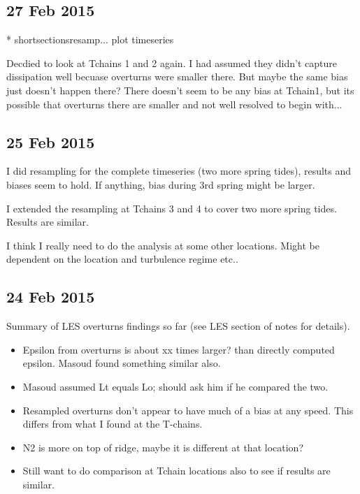 \documentclass[11pt]{article}
\begin{document}
\clearpage
\newpage
\subsection{27 Feb 2015}


* shortsectionsresamp... plot timeseries

Decdied to look at Tchains 1 and 2 again. I had assumed they didn't capture dissipation well becuase overturns were smaller there. But maybe the same bias just doesn't happen there? There doesn't seem to be any bias at Tchain1, but its possible that overturns there are smaller and not well resolved to begin with...




\clearpage
\newpage
\subsection{25 Feb 2015}

I did resampling for the complete timeseries (two more spring tides), results and biases seem to hold. If anything, bias during 3rd spring might be larger.

\vspace{1cm}

I extended the resampling at Tchains 3 and 4 to cover two more spring tides. Results are similar.

\vspace{1cm}

I think I really need to do the analysis at some other locations. Might be dependent on the location and turbulence regime etc..

\clearpage
\newpage
\subsection{24 Feb 2015}

Summary of LES overturns findings so far (see LES section of notes for details).
\begin{itemize}
\item Epsilon from overturns is about xx times larger? than directly computed epsilon. Masoud found something similar also.
\item Masoud assumed Lt equals Lo; should ask him if he compared the two.
\item Resampled overturns don't appear to have much of a bias at any speed. This differs from what I found at the T-chains.
\item N2 is more on top of ridge, maybe it is different at that location?
\item Still want to do comparison at Tchain locations also to see if results are similar.
\end{itemize}
\end{document}
